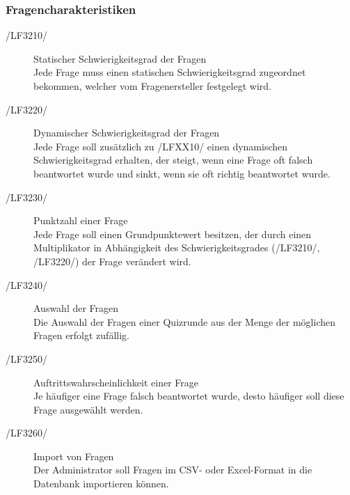 \documentclass[11pt,a4paper]{scrreprt}
\begin{document}
\subsubsection{Fragencharakteristiken}
\begin{description}
\item[/LF3210/] Statischer Schwierigkeitsgrad der Fragen \\
Jede Frage muss einen statischen Schwierigkeitsgrad zugeordnet bekommen, welcher vom Fragenersteller festgelegt wird.

\item[/LF3220/] Dynamischer Schwierigkeitsgrad der Fragen \\
Jede Frage soll zusätzlich zu /LFXX10/ einen dynamischen Schwierigkeitsgrad erhalten, der steigt, wenn eine Frage oft falsch beantwortet wurde und sinkt, wenn sie oft richtig beantwortet wurde.

\item[/LF3230/] Punktzahl einer Frage \\
Jede Frage soll einen Grundpunktewert besitzen, der durch einen Multiplikator in Abhängigkeit des Schwierigkeitsgrades (/LF3210/, /LF3220/) der Frage verändert wird.

\item[/LF3240/] Auswahl der Fragen \\
Die Auswahl der Fragen einer Quizrunde aus der Menge der möglichen Fragen erfolgt zufällig.

\item[/LF3250/] Auftrittswahrscheinlichkeit einer Frage \\
Je häufiger eine Frage falsch beantwortet wurde, desto häufiger soll diese Frage ausgewählt werden.

\item[/LF3260/] Import von Fragen \\
Der Administrator soll Fragen im CSV- oder Excel-Format in die Datenbank importieren können.
\end{description}
\end{document}
